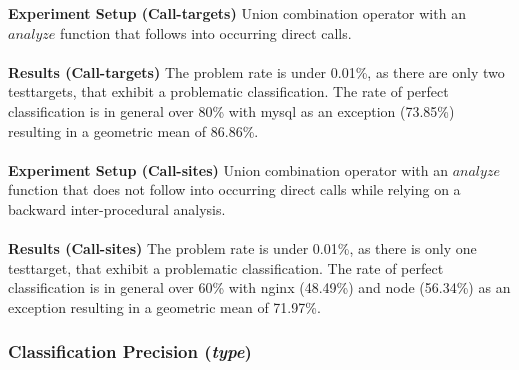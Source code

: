 \textbf{Experiment Setup (Call-targets)}
{Union combination operator with an $analyze$ function that follows into occurring direct calls.
}\\~\\
\textbf{Results (Call-targets)}{
The problem rate is under 0.01\%, as there are only two testtargets, that exhibit a problematic classification. The rate of perfect classification is in general over 80\% with mysql as an exception (73.85\%) resulting in a geometric mean of 86.86\%.
}\\~\\
\textbf{Experiment Setup (Call-sites)}
{ Union combination operator with an $analyze$ function that does not follow into occurring direct calls while relying on a backward inter-procedural analysis.
}\\~\\
\textbf{Results (Call-sites)} {
The problem rate is under 0.01\%, as there is only one testtarget, that exhibit a problematic classification. The rate of perfect classification is in general over 60\% with nginx (48.49\%) and node (56.34\%) as an exception resulting in a geometric mean of 71.97\%.}


\subsubsection{Classification Precision (\textit{type})}
\label{subsection:typeshieldcountprecision}

